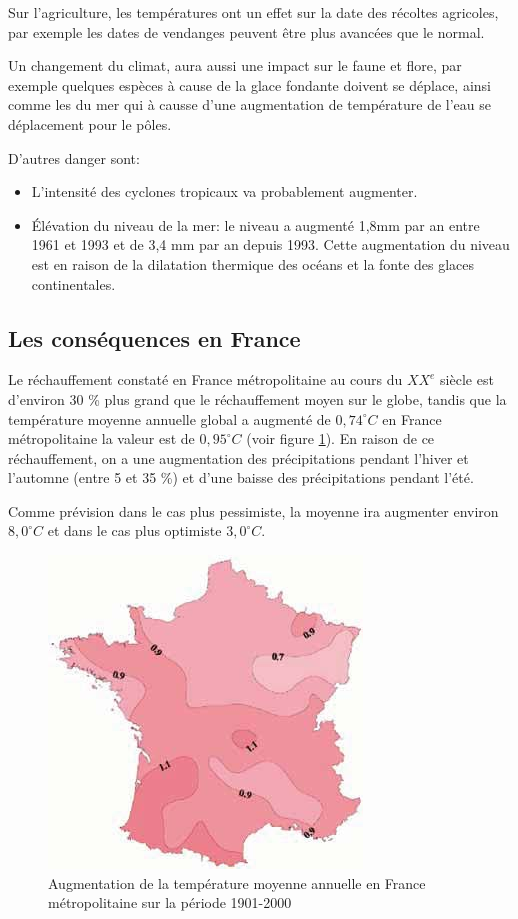 \documentclass[a4paper,11pt]{article}
\begin{document}
Sur  l'agriculture, les  températures  ont un  effet  sur la  date des  récoltes
agricoles, par exemple les dates de vendanges peuvent être plus avancées que le normal.

Un  changement du  climat, aura  aussi une  impact sur  le faune  et  flore, par
exemple quelques espèces à cause de  la glace fondante doivent se déplace, ainsi
comme les  du mer  qui à causse  d'une augmentation  de température de  l'eau se
déplacement pour le pôles.

D'autres danger sont:
\begin{itemize}
\item L'intensité des cyclones tropicaux va probablement augmenter.
\item Élévation  du niveau de la  mer: le niveau  a augmenté 1,8mm par  an entre
  1961 et 1993 et de 3,4 mm par an depuis 1993. Cette augmentation du niveau est
  en raison de la dilatation thermique des océans et la fonte des glaces continentales.
\end{itemize}


\subsection{Les conséquences en France}


Le réchauffement constaté en France métropolitaine au cours du $XX^e$ siècle 
est d’environ 30  \% plus grand que le réchauffement moyen  sur le globe, tandis
que  la température  moyenne annuelle  global a  augmenté de  $0,74^{\circ}C$ en
France métropolitaine la valeur est de $0,95^{\circ}C$ (voir figure \ref{fig:franceMoyenne}).
En raison de ce réchauffement, on a une augmentation des précipitations
pendant l'hiver et l'automne (entre 5 et 35 \%) et d’une baisse des précipitations
pendant l'été.

Comme prévision dans le cas plus pessimiste,  la moyenne ira augmenter environ $8,0^{\circ}C$ et
dans le cas plus optimiste $3,0^{\circ}C$.

\begin{figure}[H]
  \begin{centering}
    \includegraphics[scale=0.6]{fig/franceMoyenne}
    \par\end{centering}
  \caption{Augmentation de la température moyenne annuelle en France
    métropolitaine sur la période 1901-2000}
  \label{fig:franceMoyenne}
\end{figure}
\end{document}
